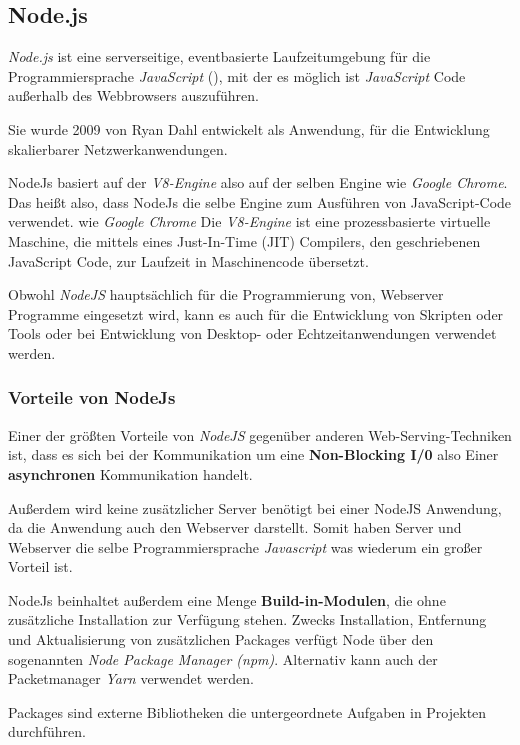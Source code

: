 \subsection{Node.js}
\label{nodejs}

\textit{Node.js} ist eine serverseitige, eventbasierte Laufzeitumgebung für die
Programmiersprache \textit{JavaScript} (),
mit der es möglich ist \textit{JavaScript} Code
außerhalb des Webbrowsers auszuführen.

Sie wurde 2009 von Ryan Dahl entwickelt als Anwendung, für die Entwicklung skalierbarer
Netzwerkanwendungen.

NodeJs basiert auf der \textit{V8-Engine} also auf der selben Engine wie \textit{Google Chrome}.
Das heißt also, dass NodeJs die selbe Engine zum Ausführen von JavaScript-Code verwendet.
wie \textit{Google Chrome}
Die \textit{V8-Engine} ist eine prozessbasierte virtuelle Maschine, die
mittels eines Just-In-Time (JIT) Compilers, den geschriebenen JavaScript Code,
zur Laufzeit in Maschinencode übersetzt.

Obwohl \textit{NodeJS} hauptsächlich für die Programmierung von, Webserver
Programme eingesetzt wird, kann es auch für die Entwicklung von
Skripten oder Tools oder bei Entwicklung von Desktop- oder Echtzeitanwendungen
verwendet werden.

\subsubsection{Vorteile von NodeJs}
Einer der größten Vorteile von \textit{NodeJS} gegenüber anderen Web-Serving-Techniken ist,
dass es sich bei der Kommunikation um eine \textbf{Non-Blocking I/0} also Einer
\textbf{asynchronen } Kommunikation handelt.

Außerdem wird keine zusätzlicher Server benötigt bei einer NodeJS Anwendung,
da die Anwendung auch den Webserver darstellt. Somit haben Server und Webserver
die selbe Programmiersprache \textit{Javascript} was wiederum ein großer Vorteil ist.

NodeJs beinhaltet außerdem eine Menge \textbf{Build-in-Modulen},
die ohne zusätzliche Installation zur Verfügung stehen.
Zwecks Installation, Entfernung und Aktualisierung von zusätzlichen Packages verfügt Node über den
sogenannten \textit{Node Package Manager (npm)}. Alternativ kann auch der Packetmanager
\textit{Yarn} verwendet werden.

Packages sind externe Bibliotheken die untergeordnete Aufgaben in Projekten durchführen.



